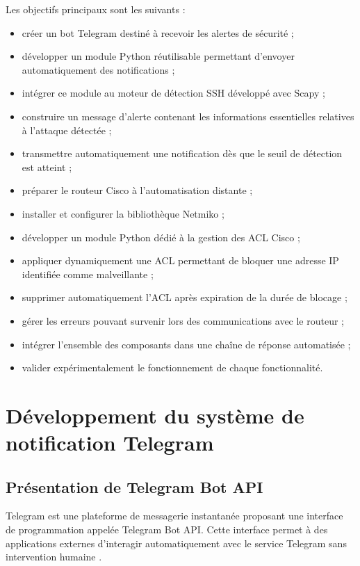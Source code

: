 Les objectifs principaux sont les suivants :

\begin{itemize}
    \item créer un bot Telegram destiné à recevoir les alertes de sécurité ;
    \item développer un module Python réutilisable permettant d'envoyer automatiquement des notifications ;
    \item intégrer ce module au moteur de détection SSH développé avec Scapy ;
    \item construire un message d'alerte contenant les informations essentielles relatives à l'attaque détectée ;
    \item transmettre automatiquement une notification dès que le seuil de détection est atteint ;
    \item préparer le routeur Cisco à l'automatisation distante ;
    \item installer et configurer la bibliothèque Netmiko ;
    \item développer un module Python dédié à la gestion des ACL Cisco ;
    \item appliquer dynamiquement une ACL permettant de bloquer une adresse IP identifiée comme malveillante ;
    \item supprimer automatiquement l'ACL après expiration de la durée de blocage ;
    \item gérer les erreurs pouvant survenir lors des communications avec le routeur ;
    \item intégrer l'ensemble des composants dans une chaîne de réponse automatisée ;
    \item valider expérimentalement le fonctionnement de chaque fonctionnalité.
\end{itemize}

\section{Développement du système de notification Telegram}

\subsection{Présentation de Telegram Bot API}

Telegram est une plateforme de messagerie instantanée proposant une interface de programmation appelée Telegram Bot API. Cette interface permet à des applications externes d'interagir automatiquement avec le service Telegram sans intervention humaine \cite{telegram_bot_api}.

